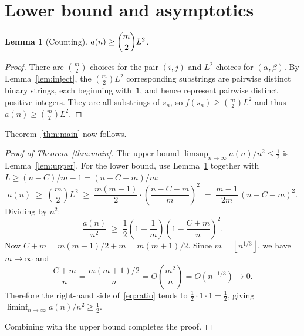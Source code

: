 \documentclass[12pt,a4paper]{article}
\theoremstyle{plain}
\newtheorem{lemma}[theorem]{Lemma}
\theoremstyle{definition}
\theoremstyle{remark}
\newcommand{\floor}[1]{\left\lfloor #1 \right\rfloor}
\begin{document}
\section{Lower bound and asymptotics}\label{sec:asymptotic}

\begin{lemma}[Counting]\label{lem:count}
  $a(n) \ge \dbinom{m}{2} L^2$.
\end{lemma}

\begin{proof}
  There are $\binom{m}{2}$ choices for the pair $(i, j)$ and $L^2$
  choices for $(\alpha, \beta)$.  By Lemma~\ref{lem:inject}, the
  $\binom{m}{2} L^2$ corresponding substrings are pairwise distinct
  binary strings, each beginning with~\texttt{1}, and hence represent
  pairwise distinct positive integers.  They are all substrings of $s_n$,
  so $f(s_n) \ge \binom{m}{2} L^2$ and thus $a(n) \ge \binom{m}{2} L^2$.
\end{proof}

Theorem~\ref{thm:main} now follows.

\begin{proof}[Proof of Theorem~\ref{thm:main}]
  The upper bound $\limsup_{n\to\infty} a(n)/n^2 \le \frac{1}{2}$ is
  Lemma~\ref{lem:upper}.  For the lower bound, use Lemma~\ref{lem:count}
  together with $L \ge (n - C)/m - 1 = (n - C - m)/m$:
  \[
    a(n)
    \;\ge\; \binom{m}{2} L^2
    \;\ge\; \frac{m(m-1)}{2} \cdot \left(\frac{n - C - m}{m}\right)^{\!2}
    \;=\; \frac{m-1}{2m}\,(n - C - m)^2.
  \]
  Dividing by $n^2$:
  \begin{equation}\label{eq:ratio}
    \frac{a(n)}{n^2}
    \;\ge\; \frac{1}{2}\!\left(1 - \frac{1}{m}\right)\!
            \left(1 - \frac{C + m}{n}\right)^{\!2}.
  \end{equation}
  Now $C + m = m(m-1)/2 + m = m(m+1)/2$.  Since $m = \floor{n^{1/3}}$,
  we have $m \to \infty$ and
  \[
    \frac{C + m}{n} = \frac{m(m+1)/2}{n} = O\!\left(\frac{m^2}{n}\right)
    = O\!\left(n^{-1/3}\right) \to 0.
  \]
  Therefore the right-hand side of~\eqref{eq:ratio} tends to
  $\frac{1}{2} \cdot 1 \cdot 1 = \frac{1}{2}$, giving
  $\liminf_{n\to\infty} a(n)/n^2 \ge \frac{1}{2}$.

  Combining with the upper bound completes the proof.
\end{proof}

\end{document}
